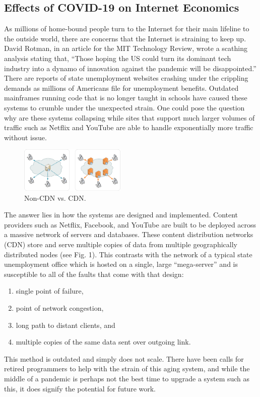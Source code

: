 \documentclass[journal]{IEEEtran}
\begin{document}
\subsection{Effects of COVID-19 on Internet Economics}
As millions of home-bound people turn to the Internet for their main lifeline to the outside world, there are concerns that the Internet is straining to keep up. David Rotman, in an article for the MIT Technology Review, wrote a scathing analysis stating that, \enquote{Those hoping the US could turn its dominant tech industry into a dynamo of innovation against the pandemic will be disappointed.} \cite{MIT_LackOfInnovation} There are reports of state unemployment websites crashing under the crippling demands \cite{IEEE_COBOL} as millions of Americans file for unemployment benefits. Outdated mainframes running code that is no longer taught in schools have caused these systems to crumble under the unexpected strain. One could pose the question why are these systems collapsing while sites that support much larger volumes of traffic such as Netflix and YouTube are able to handle exponentially more traffic without issue.\par
\begin{figure}[h]
    \centering
    \includegraphics[width=0.45\textwidth]{CDN.png}
    \caption{Non-CDN vs. CDN. \cite{Graphic_CDN}}
    \label{fig:CDN}
\end{figure}
The answer lies in how the systems are designed and implemented. Content providers such as Netflix, Facebook, and YouTube are built to be deployed across a massive network of servers and databases. These content distribution networks (CDN) store and serve multiple copies of data from multiple geographically distributed nodes (see Fig. 1). This contrasts with the network of a typical state unemployment office which is hosted on a single, large \enquote{mega-server} and is susceptible to all of the faults that come with that design:
\begin{enumerate}
    \item single point of failure,
    \item point of network congestion,
    \item long path to distant clients, and
    \item multiple copies of the same data sent over outgoing link.
\end{enumerate}
This method is outdated and simply does not scale. There have been calls for retired programmers to help with the strain of this aging system, and while the middle of a pandemic is perhaps not the best time to upgrade a system such as this, it does signify the potential for future work.
\end{document}
